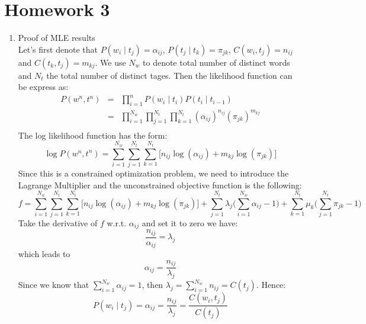 \documentclass[12pt]{article}
\begin{document}
\section*{Homework 3}
\begin{enumerate}
  \item Proof of MLE results \\  
  Let's first denote that $P(w_{i} \mid t_{j}) = \alpha_{ij}$, $P(t_{j} \mid t_{k}) = \pi_{jk}$, $C(w_{i}, t_{j}) = n_{ij}$ and $C(t_{k}, t_{j}) = m_{kj}$. We use $N_{w}$ to denote total number of distinct words and $N_{t}$ the total number of distinct tages. Then the likelihood function can be express as:
  \begin{eqnarray*}
  P(w^{n},t^{n}) &=& \prod_{i=1}^{n} P(w_{i} \mid t_{i}) P(t_{i} \mid t_{i-1}) \\ &=& \prod_{i=1}^{N_{w}} \prod_{j=1}^{N_{t}} \prod_{k=1}^{N_{t}}(\alpha_{ij})^{n_{ij}} (\pi_{jk})^{m_{kj}} \\
  \end{eqnarray*}
  The log likelihood function has the form:
  \begin{equation*}
  \log P(w^{n},t^{n}) = \sum_{i=1}^{N_{w}} \sum_{j=1}^{N_{t}} \sum_{k=1}^{N_{t}} \big[ n_{ij}  \log (\alpha_{ij}) + m_{kj} \log (\pi_{jk}) \big]
  \end{equation*}
  Since this is a constrained optimization problem, we need to introduce the Lagrange Multiplier and the unconstrained objective function is the following:
  \begin{equation*}
  f = \sum_{i=1}^{N_{w}} \sum_{j=1}^{N_{t}} \sum_{k=1}^{N_{t}} \big[ n_{ij}  \log (\alpha_{ij}) + m_{kj} \log (\pi_{jk}) \big] + \sum_{j=1}^{N_{t}} \lambda_{j} \big( \sum_{i=1}^{N_{w}} \alpha_{ij} -1 \big) + \sum_{k=1}^{N_{t}} \mu_{k} \big( \sum_{j=1}^{N_{t}} \pi_{jk} -1 \big)
  \end{equation*}
  Take the derivative of $f$ w.r.t. $\alpha_{ij}$ and set it to zero we have:
  \begin{equation*}
  \frac{n_{ij}}{\alpha_{ij}} = \lambda_{j}
  \end{equation*}
  which leads to
  \begin{equation*}
  \alpha_{ij} = \frac{n_{ij}}{\lambda_{j}}
  \end{equation*}
  Since we know that $\sum_{i=1}^{N_{w}} \alpha_{ij} = 1$, then $\lambda_{j} = \sum_{i=1}^{N_{w}} n_{ij} = C(t_{j})$. Hence:
  \begin{equation*}
  P(w_{i} \mid t_{j}) = \alpha_{ij} = \frac{n_{ij}}{\lambda_{j}} = \frac{C(w_{i}, t_{j})}{C(t_{j})}

\end{equation*}
\end{enumerate}
\end{document}
